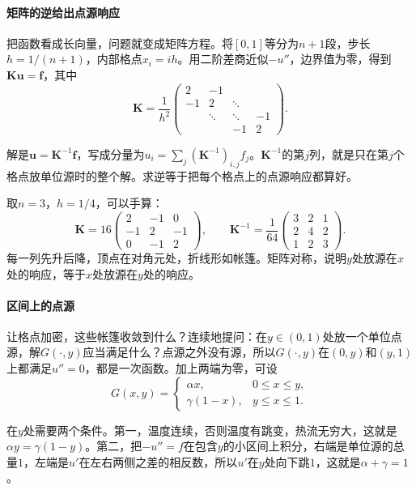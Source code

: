 \paragraph{矩阵的逆给出点源响应}
把函数看成长向量，问题就变成矩阵方程。将$[0,1]$等分为$n+1$段，步长$h=1/(n+1)$，内部格点$x_i=ih$。用二阶差商近似$-u''$，边界值为零，得到$\bm{K}\bm{u}=\bm{f}$，其中
\begin{equation}
 \bm{K}=\frac1{h^2}\begin{pmatrix}2&-1&&\\-1&2&\ddots&\\&\ddots&\ddots&-1\\&&-1&2\end{pmatrix}.
 \label{eq:ellip-discrete-laplacian}
\end{equation}

解是$\bm{u}=\bm{K}^{-1}\bm{f}$，写成分量为$u_i=\sum_j(\bm{K}^{-1})_{i,j}f_j$。$\bm{K}^{-1}$的第$j$列，就是只在第$j$个格点放单位源时的整个解。求逆等于把每个格点上的点源响应都算好。

取$n=3$，$h=1/4$，可以手算：
\[
 \bm{K}=16\begin{pmatrix}2&-1&0\\-1&2&-1\\0&-1&2\end{pmatrix},\qquad
 \bm{K}^{-1}=\frac1{64}\begin{pmatrix}3&2&1\\2&4&2\\1&2&3\end{pmatrix}.
\]
每一列先升后降，顶点在对角元处，折线形如帐篷。矩阵对称，说明$y$处放源在$x$处的响应，等于$x$处放源在$y$处的响应。

\paragraph{区间上的点源}
让格点加密，这些帐篷收敛到什么？连续地提问：在$y\in(0,1)$处放一个单位点源，解$G(\cdot,y)$应当满足什么？点源之外没有源，所以$G(\cdot,y)$在$(0,y)$和$(y,1)$上都满足$u''=0$，都是一次函数。加上两端为零，可设
\[
 G(x,y)=\begin{cases}\alpha x,&0\leq x\leq y,\\ \gamma(1-x),&y\leq x\leq1 .\end{cases}
\]

在$y$处需要两个条件。第一，温度连续，否则温度有跳变，热流无穷大，这就是$\alpha y=\gamma(1-y)$。第二，把$-u''=f$在包含$y$的小区间上积分，右端是单位源的总量$1$，左端是$u'$在左右两侧之差的相反数，所以$u'$在$y$处向下跳$1$，这就是$\alpha+\gamma=1$。

